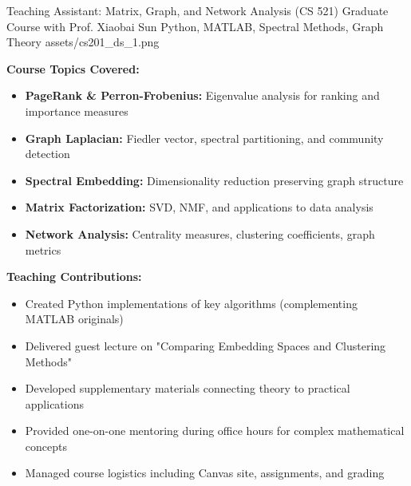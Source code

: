 
\ProjectEntry
{Teaching Assistant: Matrix, Graph, and Network Analysis (CS 521)}
{Graduate Course with Prof. Xiaobai Sun}
{Python, MATLAB, Spectral Methods, Graph Theory}
{
}
{assets/cs201_ds_1.png}
{ \quad {}}
{  }

\vspace{1em}

\textbf{Course Topics Covered:}

\begin{itemize}[leftmargin=1.2em, itemsep=0.1em]
  \item \textbf{PageRank \& Perron-Frobenius:} Eigenvalue analysis for ranking and importance measures
  \item \textbf{Graph Laplacian:} Fiedler vector, spectral partitioning, and community detection
  \item \textbf{Spectral Embedding:} Dimensionality reduction preserving graph structure
  \item \textbf{Matrix Factorization:} SVD, NMF, and applications to data analysis
  \item \textbf{Network Analysis:} Centrality measures, clustering coefficients, graph metrics
\end{itemize}

\textbf{Teaching Contributions:}

\begin{itemize}[leftmargin=1.2em, itemsep=0.1em]
  \item Created Python implementations of key algorithms (complementing MATLAB originals)
  \item Delivered guest lecture on "Comparing Embedding Spaces and Clustering Methods"
  \item Developed supplementary materials connecting theory to practical applications
  \item Provided one-on-one mentoring during office hours for complex mathematical concepts
  \item Managed course logistics including Canvas site, assignments, and grading
\end{itemize}


